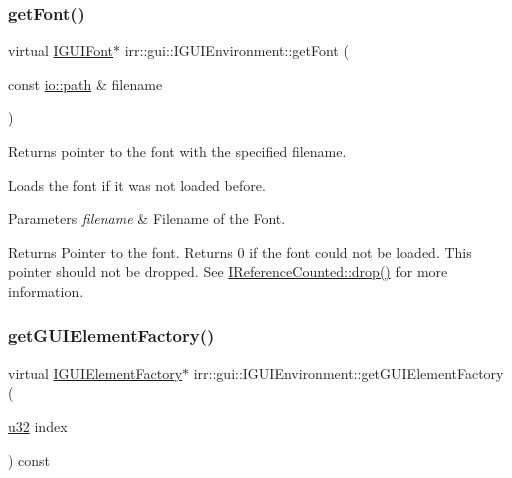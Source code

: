 \subsubsection{\texorpdfstring{get\+Font()}{getFont()}\hspace{0.1cm}{\footnotesize\ttfamily [2/2]}}
{\footnotesize\ttfamily virtual \hyperlink{classirr_1_1gui_1_1IGUIFont}{I\+G\+U\+I\+Font}$\ast$ irr\+::gui\+::\+I\+G\+U\+I\+Environment\+::get\+Font (\begin{DoxyParamCaption}\item[{const \hyperlink{namespaceirr_1_1io_a6468281622ce3a1c46b72e19f32dded5}{io\+::path} \&}]{filename }\end{DoxyParamCaption})\hspace{0.3cm}{\ttfamily [pure virtual]}}



Returns pointer to the font with the specified filename. 

Loads the font if it was not loaded before. 
\begin{DoxyParams}{Parameters}
{\em filename} & Filename of the Font. \\
\hline
\end{DoxyParams}
\begin{DoxyReturn}{Returns}
Pointer to the font. Returns 0 if the font could not be loaded. This pointer should not be dropped. See \hyperlink{classirr_1_1IReferenceCounted_a03856a09355b89d178090c4a5f738543}{I\+Reference\+Counted\+::drop()} for more information. 
\end{DoxyReturn}
\mbox{\label{classirr_1_1gui_1_1IGUIEnvironment_a3c1ec1c13e7339e2e8abb34276d6288f}} 
\subsubsection{\texorpdfstring{get\+G\+U\+I\+Element\+Factory()}{getGUIElementFactory()}\hspace{0.1cm}{\footnotesize\ttfamily [1/2]}}
{\footnotesize\ttfamily virtual \hyperlink{classirr_1_1gui_1_1IGUIElementFactory}{I\+G\+U\+I\+Element\+Factory}$\ast$ irr\+::gui\+::\+I\+G\+U\+I\+Environment\+::get\+G\+U\+I\+Element\+Factory (\begin{DoxyParamCaption}\item[{\hyperlink{namespaceirr_a0416a53257075833e7002efd0a18e804}{u32}}]{index }\end{DoxyParamCaption}) const\hspace{0.3cm}{\ttfamily [pure virtual]}}




